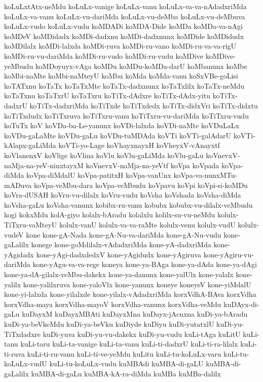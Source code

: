 {koLuLxtAtx-neMdu
koLuLx-vanige
koLuLx-vanu
koLuLx-va-va-nAdadxriMda
koLuLx-va-vanu
koLuLx-vu-dariMda
koLuLx-vu-deMba
koLuLx-vu-deMbuva
koLuLx-vudo
koLuLx-vudu
koMDADi
koMDA-Dide
koMDa
koMDa-va-nAgi
koMDeV
koMDidadx
koMDi-dadxnu
koMDi-dadxnunx
koMDide
koMDidudx
koMDilalx
koMDi-lalxda
koMDi-ruva
koMDi-ru-vano
koMDi-ru-va-va-rigU
koMDi-ru-vu-dariMda
koMDi-ru-vudo
koMDi-ru-vudu
koMDive
koMDive-yeMbudu
koMDoyuyx-vAga
koMDu
koMDu-koMDa-darU
koMbanunx
koMbe
koMbi-naMte
koMbi-naMteyU
koMbu
koMda
koMda-vanu
koSxVBe-goLisi
koTATxnu
koTaTx
koTaTxMte
koTaTx-dadxnunx
koTaTxlilx
koTaTx-neMdu
koTaTxnu
koTaTxrU
koTaTxru
koTiTx-dAdxre
koTiTx-dAdx-yitu
koTiTx-dadxrU
koTiTx-dadxriMda
koTiTxde
koTiTxdedx
koTiTx-didxVri
koTiTx-didxtu
koTiTxdudx
koTiTxruva
koTiTxru-vanu
koTiTxru-vu-dariMda
koTiTxru-vudu
koTuTx
koV
koVDa-ba-Le-yanunx
koVDi-lalxda
koVDi-naMte
koVDuLaLx
koVDu-gaLaMte
koVDu-gaLu
koVDu-tuMDAda
koVTi
koVTi-galAdarU
koVTi-kAlapx-gaLiMda
koVTi-yo-Lage
koVhayxnayxH
koVheyxV-vAnayxtf
koVlanenxV
koVlige
koVlina
koVlu
koVlu-gaLiMda
koVlu-gaLu
koVnevxV-naMja-na-yeV-ninxtayxM
koVnevxV-naMja-na-yeVtf
koVpa
koVpada
koVpa-diMda
koVpa-diMdalU
koVpa-patitxH
koVpa-vanUnx
koVpa-va-nunxMTu-mADuva
koVpa-veMbu-dara
koVpa-veMbudu
koVpavu
koVpi
koVpi-si-koMDu
koVra-dUSAH
koVru-vu-dilalx
koVru-vudu
koVsha
koVshada
koVsha-diMda
koVsha-gaLu
koVsha-vanunx
kobibx-ru-vanu
kobubx
kobubx-vu-dilalx-veMbudu
kogi
kokxMdu
kolA-giyo
kolalx-bAradu
kolalxlu
kolilx-su-vu-neMdu
kolulx-TiTxru-vaMteyU
kolulx-vanU
kolulx-va-va-raMte
kolulx-venu
kolulx-vudU
kolulx-vudeV
kone
kone-gA-Nada
kone-gA-Nu-va-dariMda
kone-gA-Nu-vudu
kone-gaLalilx
konege
kone-goMdilalx-vAdadxriMda
kone-yA-dadxriMda
kone-yAgidadx
kone-yAgi-dadxdedxV
kone-yAgidudx
kone-yAgiruva
kone-yAgiru-vu-dariMda
kone-yAgu-va-va-rege
koneya
kone-ya-BAga
kone-ya-dAda
kone-ya-dAgi
kone-ya-dA-gilalx-veMbu-dakekx
kone-ya-danunx
kone-yalUlx
kone-yalalx
kone-yalilx
kone-yalilxruva
kone-yaloVlx
kone-yanunx
koneye
koneyeV
kone-yiMdalU
kone-yi-lalxda
kone-yilalxde
kone-yilalx-vAdadxriMda
korxVdhA-BAva
korxVdha
korxVdha-maya
korxVdha-mayoV
korxVdha-vanunx
korxVdha-veMdu
kuDAyx-di-gaLu
kuDayxM
kuDayxMBAti
kuDayxMna
kuDayx-jAcnxna
kuDi-ya-bAradu
kuDi-ya-beVkeMdu
kuDi-ya-beVku
kuDiyde
kuDiyu
kuDi-yutatxlU
kuDi-yu-TiTxdadxre
kuDi-yuva
kuDi-yu-vu-dakekx
kuDi-yu-vudu
kuLi-tAga
kuLitU
kuLi-tanu
kuLi-taru
kuLi-ta-vanige
kuLi-ta-vanu
kuLi-ti-dadxrU
kuLi-ti-ra-lilalx
kuLi-ti-ruva
kuLi-ti-ru-vanu
kuLi-ti-ve-yeMdu
kuLitu
kuLi-tu-koLuLx-varu
kuLi-tu-koLuLx-vudU
kuLi-tu-koLuLx-vudu
kuMBAdi
kuMBA-di-gaLU
kuMBA-di-gaLalilx
kuMBA-di-gaLu
kuMBA-kA-ra-diMda
kuMBa
kuMBa-dalilx
}
